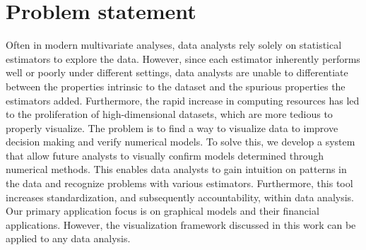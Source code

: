 \section{Problem statement}
\label{sec:intro:problemstatement}

Often in modern multivariate analyses, data analysts rely solely on statistical estimators to explore the data. However, since each estimator inherently performs well or poorly under different settings, data analysts are unable to differentiate between the properties intrinsic to the dataset and the spurious properties the estimators added. Furthermore, the rapid increase in computing resources has led to the proliferation of high-dimensional datasets, which are more tedious to properly visualize. The problem is to find a way to visualize data to improve decision making and verify numerical models. To solve this, we develop a system that allow future analysts to visually confirm models determined through numerical methods. This enables data analysts to gain intuition on patterns in the data and recognize problems with various estimators. Furthermore, this tool increases standardization, and subsequently accountability, within data analysis. Our primary application focus is on graphical models and their financial applications. However, the visualization framework discussed in this work can be applied to any data analysis.